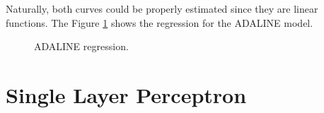 \documentclass[12pt,a4paper]{article}
\begin{document}
Naturally, both curves could be properly estimated since they are linear functions. The Figure \ref{fig:ADALINE-regression} shows the regression for the ADALINE model.

\begin{figure}[H]
    \centering



\caption{ADALINE regression.}
\label{fig:ADALINE-regression}

\end{figure}

\section{Single Layer Perceptron}
\end{document}
